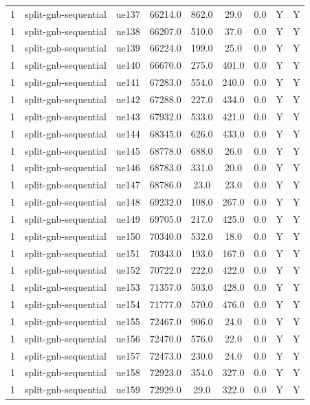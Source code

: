 \begin{table}[ht]
\begin{tabular}{|c|c|c|c|c|c|c|c|c|}
1 & split-gnb-sequential & ue137 & 66214.0 & 862.0 & 29.0 & 0.0 & Y & Y \\
1 & split-gnb-sequential & ue138 & 66207.0 & 510.0 & 37.0 & 0.0 & Y & Y \\
1 & split-gnb-sequential & ue139 & 66224.0 & 199.0 & 25.0 & 0.0 & Y & Y \\
1 & split-gnb-sequential & ue140 & 66670.0 & 275.0 & 401.0 & 0.0 & Y & Y \\
1 & split-gnb-sequential & ue141 & 67283.0 & 554.0 & 240.0 & 0.0 & Y & Y \\
1 & split-gnb-sequential & ue142 & 67288.0 & 227.0 & 434.0 & 0.0 & Y & Y \\
1 & split-gnb-sequential & ue143 & 67932.0 & 533.0 & 421.0 & 0.0 & Y & Y \\
1 & split-gnb-sequential & ue144 & 68345.0 & 626.0 & 433.0 & 0.0 & Y & Y \\
1 & split-gnb-sequential & ue145 & 68778.0 & 688.0 & 26.0 & 0.0 & Y & Y \\
1 & split-gnb-sequential & ue146 & 68783.0 & 331.0 & 20.0 & 0.0 & Y & Y \\
1 & split-gnb-sequential & ue147 & 68786.0 & 23.0 & 23.0 & 0.0 & Y & Y \\
1 & split-gnb-sequential & ue148 & 69232.0 & 108.0 & 267.0 & 0.0 & Y & Y \\
1 & split-gnb-sequential & ue149 & 69705.0 & 217.0 & 425.0 & 0.0 & Y & Y \\
1 & split-gnb-sequential & ue150 & 70340.0 & 532.0 & 18.0 & 0.0 & Y & Y \\
1 & split-gnb-sequential & ue151 & 70343.0 & 193.0 & 167.0 & 0.0 & Y & Y \\
1 & split-gnb-sequential & ue152 & 70722.0 & 222.0 & 422.0 & 0.0 & Y & Y \\
1 & split-gnb-sequential & ue153 & 71357.0 & 503.0 & 428.0 & 0.0 & Y & Y \\
1 & split-gnb-sequential & ue154 & 71777.0 & 570.0 & 476.0 & 0.0 & Y & Y \\
1 & split-gnb-sequential & ue155 & 72467.0 & 906.0 & 24.0 & 0.0 & Y & Y \\
1 & split-gnb-sequential & ue156 & 72470.0 & 576.0 & 22.0 & 0.0 & Y & Y \\
1 & split-gnb-sequential & ue157 & 72473.0 & 230.0 & 24.0 & 0.0 & Y & Y \\
1 & split-gnb-sequential & ue158 & 72923.0 & 354.0 & 327.0 & 0.0 & Y & Y \\
1 & split-gnb-sequential & ue159 & 72929.0 & 29.0 & 322.0 & 0.0 & Y & Y \\

\end{tabular}
\end{table}
